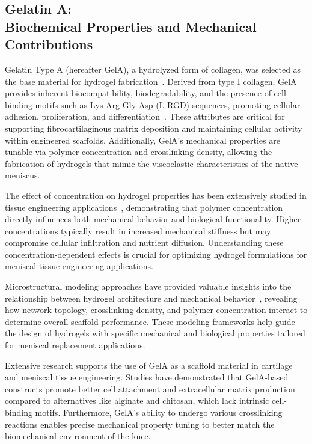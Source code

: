\subsection{Gelatin A: \protect\\ Biochemical Properties and Mechanical Contributions}

Gelatin Type A (hereafter GelA), a hydrolyzed form of collagen, was selected as the base material for hydrogel fabrication~\cite{ahmed2015hydrogelpreparation}. Derived from type I collagen, GelA provides inherent biocompatibility, biodegradability, and the presence of cell-binding motifs such as Lys-Arg-Gly-Asp (L-RGD) sequences, promoting cellular adhesion, proliferation, and differentiation~\cite{2021synthesisapplication,ahmed2015hydrogelpreparation,choi20213dprintedgelatin,zhang2005electrospinninggelatin}. These attributes are critical for supporting fibrocartilaginous matrix deposition and maintaining cellular activity within engineered scaffolds. Additionally, GelA's mechanical properties are tunable via polymer concentration and crosslinking density, allowing the fabrication of hydrogels that mimic the viscoelastic characteristics of the native meniscus.

The effect of concentration on hydrogel properties has been extensively studied in tissue engineering applications~\cite{buckley2009effectconcentration}, demonstrating that polymer concentration directly influences both mechanical behavior and biological functionality. Higher concentrations typically result in increased mechanical stiffness but may compromise cellular infiltration and nutrient diffusion. Understanding these concentration-dependent effects is crucial for optimizing hydrogel formulations for meniscal tissue engineering applications.

Microstructural modeling approaches have provided valuable insights into the relationship between hydrogel architecture and mechanical behavior~\cite{bursac2000microstructuralmodel}, revealing how network topology, crosslinking density, and polymer concentration interact to determine overall scaffold performance. These modeling frameworks help guide the design of hydrogels with specific mechanical and biological properties tailored for meniscal replacement applications.

Extensive research supports the use of GelA as a scaffold material in cartilage and meniscal tissue engineering. Studies have demonstrated that GelA-based constructs promote better cell attachment and extracellular matrix production compared to alternatives like alginate and chitosan, which lack intrinsic cell-binding motifs. Furthermore, GelA's ability to undergo various crosslinking reactions enables precise mechanical property tuning to better match the biomechanical environment of the knee.

